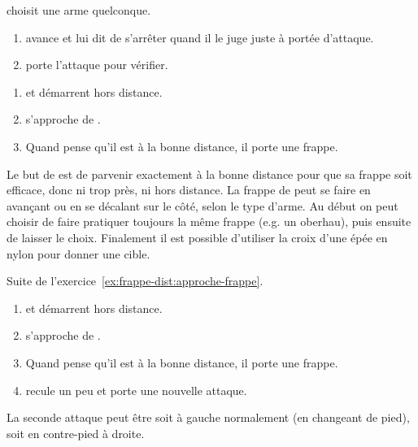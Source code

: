 \begin{exercice}
	
	
	\A choisit une arme quelconque.

	\begin{enumerate}
		\item \D avance et \A lui dit de s'arrêter quand il le juge juste à portée d'attaque.
		
		\item \A porte l'attaque pour vérifier.
	\end{enumerate}

\end{exercice}


\begin{exercice}
	\label{ex:frappe-dist:approche-frappe}
	

	\begin{enumerate}
		\item \A et \D démarrent hors distance.
		\item \D s'approche de \A.
		\item Quand \A pense qu'il est à la bonne distance, il porte une frappe.
	\end{enumerate}

	Le but de \A est de parvenir exactement à la bonne distance pour que sa frappe soit efficace, donc ni trop près, ni hors distance.
	La frappe de \A peut se faire en avançant ou en se décalant sur le côté, selon le type d'arme.
	Au début on peut choisir de faire pratiquer toujours la même frappe (e.g.
	un oberhau), puis ensuite de laisser le choix.
	Finalement il est possible d'utiliser la croix d'une épée en nylon pour donner une cible.
\end{exercice}


\begin{exercice}
	\label{ex:frappe-dist:approche-double-frappe}
	

	Suite de l'exercice~\ref{ex:frappe-dist:approche-frappe}.

	\begin{enumerate}
		\item \A et \D démarrent hors distance.
		\item \D s'approche de \A.
		\item Quand \A pense qu'il est à la bonne distance, il porte une frappe.
		\item \D recule un peu et \A porte une nouvelle attaque.
	\end{enumerate}

	La seconde attaque peut être soit à gauche normalement (en changeant de pied), soit en contre-pied à droite.
\end{exercice}


